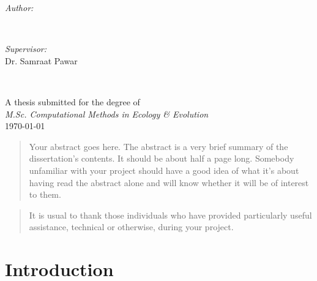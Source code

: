 \documentclass[a4paper, twoside]{report}
\begin{document}
\begin{titlepage}
    \begin{minipage}{0.4\textwidth}
    \begin{flushleft} \large
    \emph{Author:}\\
    \@author %
    \end{flushleft}
    \end{minipage}
    ~
    \begin{minipage}{0.4\textwidth}
    \begin{flushright} \large
    \emph{Supervisor:} \\
    Dr. Samraat Pawar 
    \end{flushright}
    \end{minipage}\\[3cm]
    \makeatother
    
    
    
    {\large A thesis submitted for the degree of}\\[0.5cm]
    {\large \emph{M.Sc. Computational Methods in Ecology \& Evolution}}\\[0.5cm]
    {\large \today}\\[2cm] %
    
    \vfill %
    
\end{titlepage}

\begin{abstract}
    Your abstract goes here. The abstract is a very brief summary of the dissertation's contents. It should be about half a page long. Somebody unfamiliar with your project should have a good idea of what it's about having read the abstract alone and will know whether it will be of interest to them.
\end{abstract}

\renewcommand{\abstractname}{Acknowledgements}
\begin{abstract}
    It is usual to thank those individuals who have provided particularly useful assistance, technical or otherwise, during your project.
\end{abstract}

\tableofcontents
\listoffigures
\listoftables


\section{Introduction}



\end{document}
